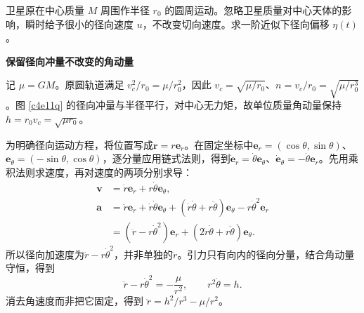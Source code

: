 \begin{question}
\begin{example}[卫星的径向微扰]
卫星原在中心质量 $M$ 周围作半径 $r_0$ 的圆周运动。忽略卫星质量对中心天体的影响，瞬时给予很小的径向速度 $u$，不改变切向速度。求一阶近似下径向偏移 $\eta(t)$。
\end{example}
\end{question}
\begin{solution}\textbf{保留径向冲量不改变的角动量}\par\nobreak
记 $\mu=GM$。原圆轨道满足 $v_c^2/r_0=\mu/r_0^2$，因此 $v_c=\sqrt{\mu/r_0}$、$n=v_c/r_0=\sqrt{\mu/r_0^3}$。图 \ref{c4e11q} 的径向冲量与半径平行，对中心无力矩，故单位质量角动量保持 $h=r_0v_c=\sqrt{\mu r_0}$。

为明确径向运动方程，将位置写成$\bm r=r\bm e_r$。在固定坐标中$\bm e_r=(\cos\theta,\sin\theta)$、$\bm e_\theta=(-\sin\theta,\cos\theta)$，逐分量应用链式法则，得到$\dot{\bm e}_r=\dot\theta\bm e_\theta$、$\dot{\bm e}_\theta=-\dot\theta\bm e_r$。先用乘积法则求速度，再对速度的两项分别求导：
\begin{align*}
\bm v&=\dot r\bm e_r+r\dot\theta\bm e_\theta,\\
\bm a&=\ddot r\bm e_r+\dot r\dot\theta\bm e_\theta
 +(\dot r\dot\theta+r\ddot\theta)\bm e_\theta
 -r\dot\theta^2\bm e_r\\
&=(\ddot r-r\dot\theta^2)\bm e_r
 +(2\dot r\dot\theta+r\ddot\theta)\bm e_\theta.
\end{align*}
所以径向加速度为$\ddot r-r\dot\theta^2$，并非单独的$\ddot r$。引力只有向内的径向分量，结合角动量守恒，得到
\[
 \ddot r-r\dot\theta^2=-\frac{\mu}{r^2},\qquad
 r^2\dot\theta=h.
\]
消去角速度而非把它固定，得到
$\ddot r=h^2/r^3-\mu/r^2$。




\end{solution}
